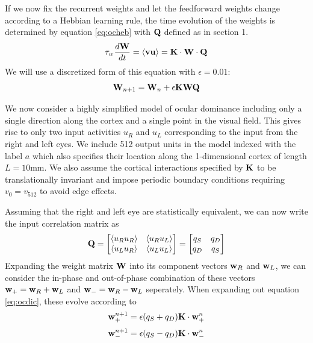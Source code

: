 \documentclass{article}
\begin{document}
If we now fix the recurrent weights and let the feedforward weights change according to a Hebbian learning rule, the time evolution of the weights is determined by equation \ref{eq:ocheb} with $\bf Q$ defined as in section 1.
\begin{equation}\label{eq:ocheb}
\tau_w \dfrac{d{\bf W}}{dt} = \braket{\bf vu} = {\bf K \cdot W \cdot Q}
\end{equation}
We will use a discretized form of this equation with $\epsilon = 0.01$:
\begin{equation}\label{eq:ocdic}
{\bf W}_{n+1} = {\bf W}_n + \epsilon \bf K W Q
\end{equation}

We now consider a highly simplified model of ocular dominance including only a single direction along the cortex and a single point in the visual field. This gives rise to only two input activities $u_R$ and $u_L$ corresponding to the input from the right and left eyes. We include 512 output units in the model indexed with the label $a$ which also specifies their location along the 1-dimensional cortex of length $L = 10$mm.
We also assume the cortical interactions specified by $\bf K$ to be translationally invariant and impose periodic boundary conditions requiring $v_0 = v_{512}$ to avoid edge effects.

Assuming that the right and left eye are statistically equivalent, we can now write the input correlation matrix as
\[
{\bf Q} = 
\begin{bmatrix}
   \braket{u_R u_R} & \braket{u_R u_L} \\
   \braket{u_L u_R} & \braket{u_L u_L}  \\
\end{bmatrix}
=
\begin{bmatrix}
   q_S &q_D \\
   q_D & q_S  \\
\end{bmatrix}
\]
Expanding the weight matrix $\bf W$ into its component vectors ${\bf w}_R$ and ${\bf w}_L$, we can consider the in-phase and out-of-phase combination of these vectors ${\bf w}_+ = {\bf w}_R + {\bf w}_L $ and ${\bf w}_- = {\bf w}_R - {\bf w}_L $ seperately. When expanding out equation \ref{eq:ocdic}, these evolve according to
\begin{equation}
{\bf w}_{+}^{n+1} = \epsilon (q_S+q_D){\bf K \cdot w}_+^n
\end{equation}
\begin{equation}
{\bf w}_{-}^{n+1} = \epsilon (q_S-q_D){\bf K \cdot w}_-^n
\end{equation}
\end{document}
